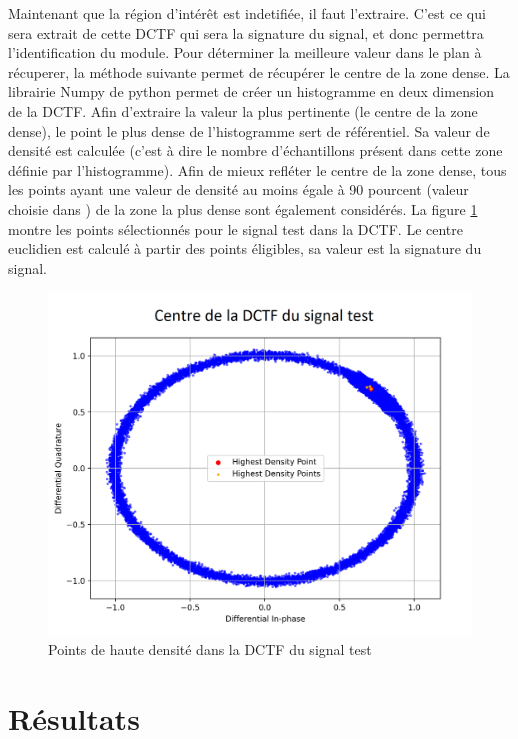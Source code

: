 Maintenant que la région d'intérêt est indetifiée, il faut l'extraire. C'est ce qui sera extrait de cette DCTF qui sera la signature du signal, et donc permettra l'identification du module. Pour déterminer la meilleure valeur dans le plan à récuperer, la méthode suivante permet de récupérer le centre de la zone dense. La librairie Numpy de python permet de créer un histogramme en deux dimension de la DCTF. Afin d'extraire la valeur la plus pertinente (le centre de la zone dense), le point le plus dense de l'histogramme sert de référentiel. Sa valeur de densité est calculée (c'est à dire le nombre d'échantillons présent dans cette zone définie par l'histogramme). Afin de mieux refléter le centre de la zone dense, tous les points ayant une valeur de densité au moins égale à 90 pourcent (valeur choisie dans \cite{loraDCTF}) de la zone la plus dense sont également considérés. La figure \ref{term319} montre les points sélectionnés pour le signal test dans la DCTF. Le centre euclidien est calculé à partir des points éligibles, sa valeur est la signature du signal. 


\begin{figure}[h]
\centering

\includegraphics[scale=0.35]{images/dctf6.png}
\caption{Points de haute densité dans la DCTF du signal test}\label{term319}
\end{figure}

\section{Résultats}\label{result}

